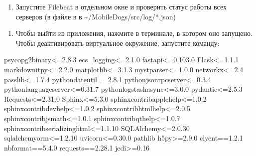 \documentclass[letterpaper,10pt,russian]{sphinxmanual}
\begin{document}
\begin{sphinxVerbatim}[commandchars=\\\{\}]
  
\end{sphinxVerbatim}
\begin{enumerate}
%
\setcounter{enumi}{4}
\item {} 
\sphinxAtStartPar
Запустите Filebeat в отдельном окне и проверить статус работы всех серверов (в файле  в  в  \textasciitilde{}/MobileDogs/src/log/*.json)

\end{enumerate}

\begin{sphinxVerbatim}[commandchars=\\\{\}]
   
   
   
  
\end{sphinxVerbatim}
\begin{enumerate}
%
\setcounter{enumi}{5}
\item {} 
\sphinxAtStartPar
Чтобы выйти из приложения, нажмите  в терминале, в котором оно запущено. Чтобы деактивировать виртуальное окружение, запустите команду: 

\end{enumerate}

\sphinxstepscope

\sphinxAtStartPar
psycopg2\sphinxhyphen{}binary\textless{}=2.8.3
ecs\_logging\textless{}=2.1.0
fastapi\textless{}=0.103.0
Flask\textless{}=1.1.1
markdown\sphinxhyphen{}it\sphinxhyphen{}py\textless{}=2.2.0
matplotlib\textless{}=3.1.3
myst\sphinxhyphen{}parser\textless{}=1.0.0
networkx\textless{}=2.4
passlib\textless{}=1.7.4
python\sphinxhyphen{}dateutil==2.8.1
python\sphinxhyphen{}jsonrpc\sphinxhyphen{}server\textless{}=0.3.4
python\sphinxhyphen{}language\sphinxhyphen{}server\textless{}=0.31.7
python\sphinxhyphen{}logstash\sphinxhyphen{}async\textless{}=3.0.0
pydantic\textless{}=2.5.3
Requests\textless{}=2.31.0
Sphinx\textless{}=5.3.0
sphinxcontrib\sphinxhyphen{}applehelp\textless{}=1.0.2
sphinxcontrib\sphinxhyphen{}devhelp\textless{}=1.0.2
sphinxcontrib\sphinxhyphen{}htmlhelp\textless{}=2.0.5
sphinxcontrib\sphinxhyphen{}jsmath\textless{}=1.0.1
sphinxcontrib\sphinxhyphen{}qthelp\textless{}=1.0.7
sphinxcontrib\sphinxhyphen{}serializinghtml\textless{}=1.1.10
SQLAlchemy\textless{}=2.0.30
sqlalchemy\sphinxhyphen{}orm\textless{}=1.2.10
uvicorn\textless{}=0.30.0
pathlib
h5py\textgreater{}=2.9.0
clyent==1.2.1
nbformat==5.4.0
requests==2.28.1
jedi\textgreater{}=0.16
\end{document}
